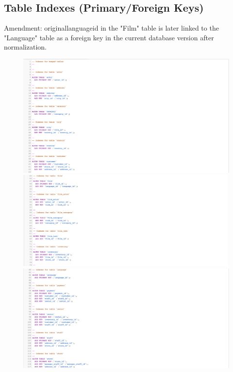 \documentclass[openany]{article}
\begin{document}
\subsection{Table Indexes (Primary/Foreign Keys)}
	Amendment: original\textunderscore language\textunderscore id in the "Film" table is later linked to the "Language" table as a foreign key in the current database version after normalization.
	\begin{figure}[H]
		\includegraphics[width=\textwidth]{tableindexkeys1}
		\includegraphics[width=\textwidth]{tableindexkeys2}
		\includegraphics[width=\textwidth]{tableindexkeys3}
	\end{figure}	
\end{document}
